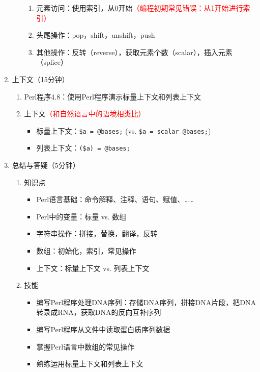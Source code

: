 \documentclass{TIJMUjiaoanLL}
\begin{document}
\begin{enumerate}
\begin{enumerate}
\begin{enumerate}
	  \item 元素访问：使用索引，从0开始\textcolor{red}{（编程初期常见错误：从1开始进行索引）}
	  \item 头尾操作：pop，shift，unshift，push
	  \item 其他操作：反转（reverse），获取元素个数（scalar），插入元素（splice）
	\end{enumerate}
    \end{enumerate}
  \item 上下文（15分钟）
    \begin{enumerate}
      \item Perl程序4.8：使用Perl程序演示标量上下文和列表上下文
      \item 上下文\textcolor{red}{（和自然语言中的语境相类比）}
	\begin{itemize}
	  \item 标量上下文：\verb|$a = @bases;| (vs. \verb|$a = scalar @bases;|)
	  \item 列表上下文：\verb|($a) = @bases;|
	\end{itemize}
    \end{enumerate}
  \item 总结与答疑（5分钟）
    \begin{enumerate}
      \item 知识点
	\begin{itemize}
	  \item Perl语言基础：命令解释、注释、语句、赋值、……
	  \item Perl中的变量：标量 vs. 数组
	  \item 字符串操作：拼接，替换，翻译，反转
	  \item 数组：初始化，索引，常见操作
	  \item 上下文：标量上下文 vs. 列表上下文
	\end{itemize}
      \item 技能
	\begin{itemize}
	  \item 编写Perl程序处理DNA序列：存储DNA序列，拼接DNA片段，把DNA转录成RNA，获取DNA的反向互补序列
	  \item 编写Perl程序从文件中读取蛋白质序列数据
	  \item 掌握Perl语言中数组的常见操作
	  \item 熟练运用标量上下文和列表上下文
	\end{itemize}
    \end{enumerate}
\end{enumerate}

\otherTail

\end{document}
